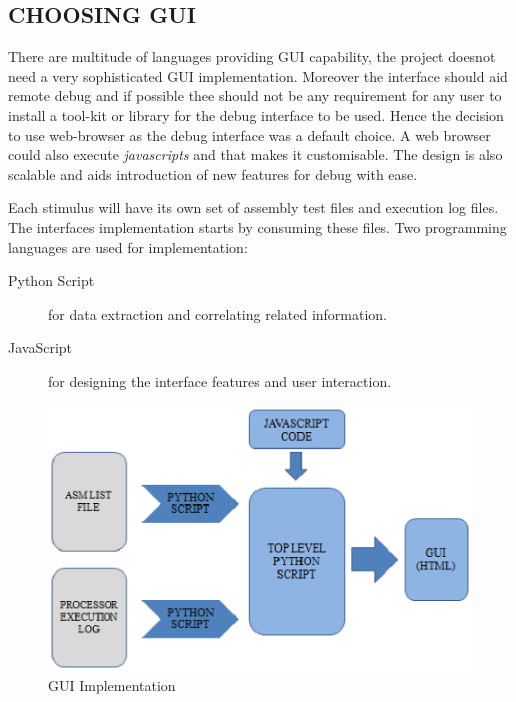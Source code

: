 
\subsection {CHOOSING GUI}
There are multitude of languages providing GUI capability, the project doesnot need a very sophisticated GUI implementation. Moreover the interface should aid remote debug and if possible thee should not be any requirement for any user to install a tool-kit or library for the debug interface to be used. Hence the decision to use web-browser as the debug interface was a default choice. A web browser could also execute {\it javascripts} and that makes it customisable. The design is also scalable and aids introduction of new features for debug with ease.

Each stimulus will have its own set of assembly test files and execution log files. The interfaces implementation starts by consuming these files. Two programming languages are used for implementation:
\begin{description}
\item[Python Script] for data extraction and correlating related information.
\item[JavaScript] for designing the interface features and user interaction.
\end{description}

\begin{figure}[h]
\centering
\includegraphics[width=5.5in]{./figures/gui_impl.eps}
\caption{GUI Implementation} 
\label{fig:gui_impl.eps}
\end{figure}

